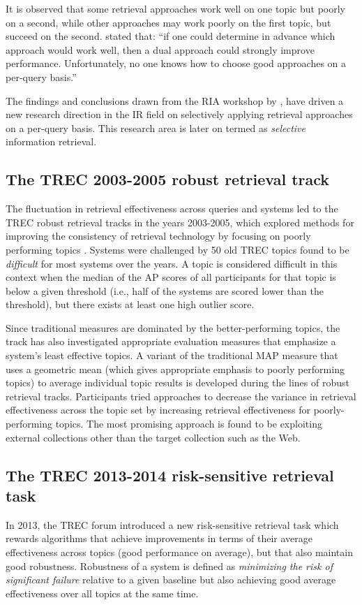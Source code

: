 It is observed that some retrieval approaches work well on one topic but poorly on a second, while other approaches may work poorly on the first topic, but succeed on the second.
\citet{IRFail} stated that: ``if one could determine in advance which approach would work well, then a dual approach could strongly improve performance. 
Unfortunately, no one knows how to choose good approaches on a per-query basis.''

The findings and conclusions drawn from the RIA workshop by \citet{ria2,ria}, have driven a new research direction in the IR field on selectively applying retrieval approaches on a per-query basis.
This research area is later on termed as \emph{selective} information retrieval.

\subsection{The TREC 2003-2005 robust retrieval track}
The fluctuation in retrieval effectiveness across queries and systems led to the TREC robust retrieval tracks in the years 2003-2005, which explored methods for improving the consistency of retrieval technology by focusing on poorly performing topics \citep{robust}.
Systems were challenged by 50 old TREC topics found to be \emph{difficult} for most systems over the years. 
A topic is considered difficult in this context when the median of the AP scores of all participants for that topic is below a given threshold 
(i.e., half of the systems are scored lower than the threshold), but there exists at least one high outlier score.

Since traditional measures are dominated by the better-performing topics, the track has also investigated appropriate evaluation measures that emphasize a system's least effective topics.  
A variant of the traditional MAP measure that uses a geometric mean (which gives appropriate emphasis to poorly performing topics) to average individual topic results is developed during the lines of robust retrieval tracks.
Participants tried approaches to decrease the variance in retrieval effectiveness across the topic set by increasing retrieval effectiveness for poorly-performing topics.
The most promising approach is found to be exploiting external collections other than the target collection such as the Web. 

\subsection{The TREC 2013-2014 risk-sensitive retrieval task}
In 2013, the TREC forum introduced a new risk-sensitive retrieval task \citep{2013web} which rewards algorithms that achieve improvements in terms of their average effectiveness across topics (good performance on average), but that also maintain good robustness.
Robustness of a system is defined as \emph{minimizing the risk of significant failure} relative to a given baseline but also achieving good average effectiveness over all topics at the same time.

